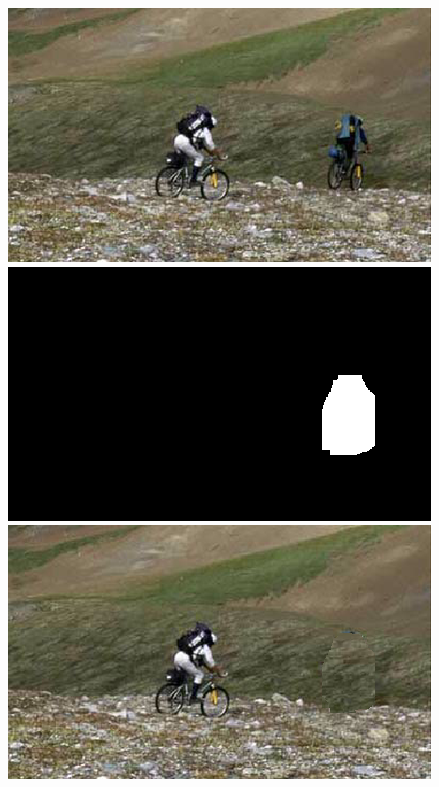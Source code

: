 \documentclass[a4paper, 10pt]{article}
\begin{document}
\begin{figure}
\begin{minipage}{.4\textwidth}
\centering
\includegraphics[scale=0.25]{images/bike.png}
\end{minipage}%
\begin{minipage}{.4\textwidth}
\centering
\includegraphics[scale=0.25]{bike_mask17.png}
\end{minipage}%
\begin{minipage}{.4\textwidth}
\centering
\includegraphics[scale=0.25]{inpainted_bike17.png}
\end{minipage}%

\end{figure}
\end{document}
